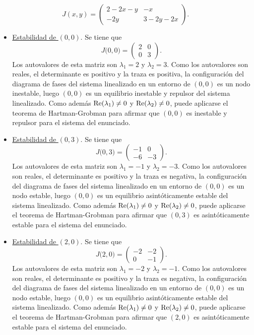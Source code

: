 \documentclass[11pt]{report}
\begin{document}
\begin{solution}
    \[
        J(x,y) = \left(\begin{array}{cc}
            2-2x-y & -x \\
            -2y & 3-2y-2x
        \end{array}\right).
    \]
    \begin{itemize}
        \item \underline{Estabilidad de $(0,0)$}. Se tiene que
        \[J\bigl(0,0\bigr) = \left(\begin{array}{cc}
            2 & 0 \\
            0 & 3
        \end{array}\right).\]
        Los autovalores de esta matriz son $\lambda_1 = 2$ y $\lambda_2 = 3$. Como los autovalores son reales, el determinante es positivo y la traza es positiva, la configuración del diagrama de fases del sistema linealizado en un entorno de $(0,0)$ es un nodo inestable, luego $(0,0)$ es un equilibrio inestable y repulsor del sistema linealizado. Como además $\textup{Re}(\lambda_1)\neq0$ y $\textup{Re}(\lambda_2)\neq0$, puede aplicarse el teorema de Hartman-Grobman para afirmar que $(0,0)$ es inestable y repulsor para el sistema del enunciado.
        \item \underline{Estabilidad de $(0,3)$}. Se tiene que
        \[J\bigl(0,3\bigr) = \left(\begin{array}{cc}
            -1 & 0 \\
            -6 & -3
        \end{array}\right).\]
        Los autovalores de esta matriz son $\lambda_1 = -1$ y $\lambda_2 = -3$. Como los autovalores son reales, el determinante es positivo y la traza es negativa, la configuración del diagrama de fases del sistema linealizado en un entorno de $(0,0)$ es un nodo estable, luego $(0,0)$ es un equilibrio asintóticamente estable del sistema linealizado. Como además $\textup{Re}(\lambda_1)\neq0$ y $\textup{Re}(\lambda_2)\neq0$, puede aplicarse el teorema de Hartman-Grobman para afirmar que $(0,3)$ es asintóticamente estable para el sistema del enunciado.
        \item \underline{Estabilidad de $(2,0)$}. Se tiene que
        \[J\bigl(2,0\bigr) = \left(\begin{array}{cc}
            -2 & -2 \\
            0 & -1
        \end{array}\right).\]
        Los autovalores de esta matriz son $\lambda_1 = -2$ y $\lambda_2 = -1$. Como los autovalores son reales, el determinante es positivo y la traza es negativa, la configuración del diagrama de fases del sistema linealizado en un entorno de $(0,0)$ es un nodo estable, luego $(0,0)$ es un equilibrio asintóticamente estable del sistema linealizado. Como además $\textup{Re}(\lambda_1)\neq0$ y $\textup{Re}(\lambda_2)\neq0$, puede aplicarse el teorema de Hartman-Grobman para afirmar que $(2,0)$ es asintóticamente estable para el sistema del enunciado.

\end{itemize}
\end{solution}
\end{document}
